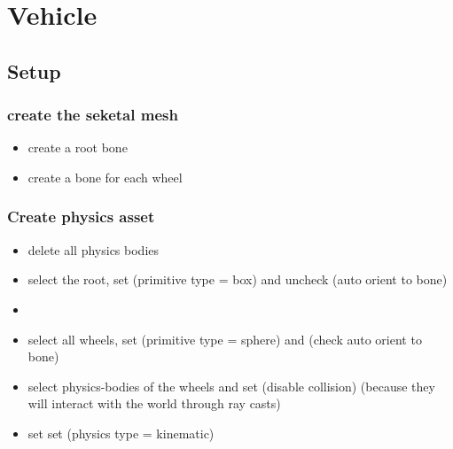 \section{Vehicle}
    \subsection{Setup}
        \subsubsection{create the seketal mesh}
            \begin{itemize}
                \item create a root bone
                \item create a bone for each wheel
            \end{itemize}

        \subsubsection{Create physics asset}
            \begin{itemize}
                \item delete all physics bodies
                \item select the root, set \code(primitive type = box) and uncheck \code(auto orient to bone)
                \item 
                \item select all wheels, set \code(primitive type = sphere) and \code(check auto orient to bone)
                \item select physics-bodies of the wheels and set \code(disable collision) (because they will interact with the world through ray casts)
                \item set set \code(physics type = kinematic)
            \end{itemize}
        
